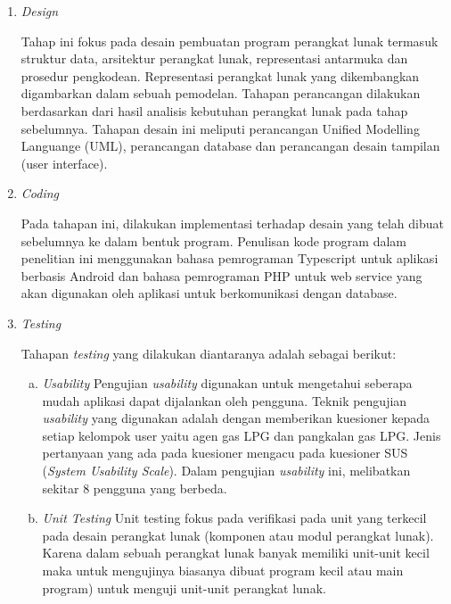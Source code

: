 \begin{enumerate}[1.]
\begin{enumerate}[a.]
		
	\end{enumerate}

	\item \textit{Design}
	
	Tahap ini fokus pada desain pembuatan program perangkat lunak termasuk struktur data, arsitektur perangkat lunak, representasi antarmuka dan prosedur pengkodean. Representasi perangkat lunak yang dikembangkan digambarkan dalam sebuah pemodelan. Tahapan perancangan dilakukan berdasarkan dari hasil analisis kebutuhan perangkat lunak pada tahap sebelumnya. Tahapan desain ini meliputi perancangan Unified Modelling Languange (UML), perancangan database dan perancangan desain tampilan (user interface).
	
	\item \textit{Coding}
	
	Pada tahapan ini, dilakukan implementasi terhadap desain yang telah dibuat sebelumnya ke dalam bentuk program. Penulisan kode program dalam penelitian ini menggunakan bahasa pemrograman Typescript untuk aplikasi berbasis Android dan bahasa pemrograman PHP untuk web service yang akan digunakan oleh aplikasi untuk berkomunikasi dengan database.
	
	\newpage
	 \item \textit{Testing}
	
	Tahapan \textit{testing} yang dilakukan diantaranya adalah sebagai berikut:
	\begin{enumerate}[a.]
			\itemsep0em
			\item \textit{Usability}
			\newline Pengujian \textit{usability} digunakan untuk mengetahui seberapa mudah aplikasi dapat dijalankan oleh pengguna. Teknik pengujian \textit{usability} yang digunakan adalah dengan memberikan kuesioner kepada setiap kelompok user yaitu agen gas LPG dan pangkalan gas LPG. Jenis pertanyaan yang ada pada kuesioner mengacu pada kuesioner SUS (\textit{System Usability Scale}). Dalam pengujian \textit{usability} ini, melibatkan sekitar 8 pengguna yang berbeda.
			\item \textit{Unit Testing}
			\newline Unit testing fokus pada verifikasi pada unit yang terkecil pada desain perangkat lunak (komponen atau modul perangkat lunak). Karena dalam sebuah perangkat lunak banyak memiliki unit-unit kecil maka untuk mengujinya biasanya dibuat program kecil atau main program) untuk menguji unit-unit perangkat lunak.
		
	\end{enumerate}
	
	
\end{enumerate}


